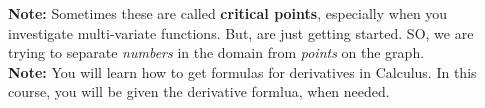 \documentclass{ximera}
\begin{document}
\textbf{Note:}  Sometimes these are called \textbf{critical points}, especially when you investigate multi-variate functions.  But, are just getting started.  SO, we are trying to separate \textit{numbers} in the domain from \textit{points} on the graph. \\


\textbf{Note:} You will learn how to get formulas for derivatives in Calculus.  In this course, you will be given the derivative formlua, when needed. \\
\end{document}
